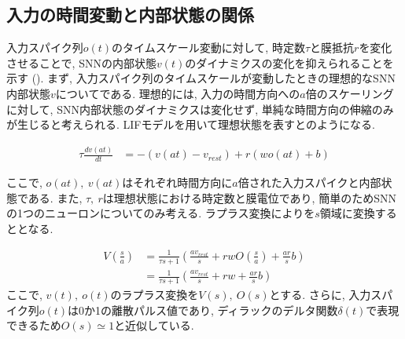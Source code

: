 \makeatletter %
\subsection{入力の時間変動と内部状態の関係}

入力スパイク列$o(t)$のタイムスケール変動に対して, 時定数$\tau$と膜抵抗$r$を変化させることで, SNNの内部状態$v(t)$のダイナミクスの変化を抑えられることを示す ().
まず, 入力スパイク列のタイムスケールが変動したときの理想的なSNN内部状態$v$についてである.
理想的には, 入力の時間方向への$a$倍のスケーリングに対して, SNN内部状態のダイナミクスは変化せず, 単純な時間方向の伸縮のみが生じると考えられる.
LIFモデルを用いて理想状態を表すとのようになる.

\begin{equation}
    \begin{split}
        \tau \frac{dv(at)}{dt} &= -(v(at)-v_{rest}) + r(w o(at) + b)
    \end{split}
    \label{sec2:eq:ideal}
\end{equation}

ここで, $o(at),~v(at)$はそれぞれ時間方向に$a$倍された入力スパイクと内部状態である.
また, $\tau,~r$は理想状態における時定数と膜電位であり, 簡単のためSNNの1つのニューロンについてのみ考える.
ラプラス変換によりを$s$領域に変換するととなる.

\begin{equation}
    \begin{split}
        V(\frac{s}{a}) &= \frac{1}{\tau s+1}(\frac{a v_{rest}}{s}+r w O(\frac{s}{a})+\frac{ar}{s}b)\\
        &= \frac{1}{\tau s+1}(\frac{a v_{rest}}{s}+r w +\frac{ar}{s}b)
    \end{split}
    \label{sec2:eq:ideal_laplace}
\end{equation}
ここで, $v(t),~o(t)$のラプラス変換を$V(s), ~ O(s)$とする.
さらに, 入力スパイク列$o(t)$は0か1の離散パルス値であり, ディラックのデルタ関数$\delta(t)$で表現できる\cite{Henkes2024}ため$O(s)\simeq1$と近似している.

